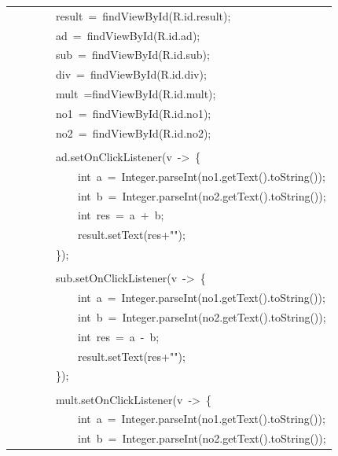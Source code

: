 \documentclass[a4paper,12pt]{article}
\begin{document}
\begin{longtable}{|p{}|}
{\ttfamily\small \ \ \ \ \ \ \ \ result\ =\ findViewById(R.id.result);} \\
{\ttfamily\small \ \ \ \ \ \ \ \ ad\ =\ findViewById(R.id.ad);} \\
{\ttfamily\small \ \ \ \ \ \ \ \ sub\ =\ findViewById(R.id.sub);} \\
{\ttfamily\small \ \ \ \ \ \ \ \ div\ =\ findViewById(R.id.div);} \\
{\ttfamily\small \ \ \ \ \ \ \ \ mult\ =findViewById(R.id.mult);} \\
{\ttfamily\small \ \ \ \ \ \ \ \ no1\ =\ findViewById(R.id.no1);} \\
{\ttfamily\small \ \ \ \ \ \ \ \ no2\ =\ findViewById(R.id.no2);} \\
\strut \\
{\ttfamily\small \ \ \ \ \ \ \ \ ad.setOnClickListener(v\ -\textgreater{}\ \{} \\
{\ttfamily\small \ \ \ \ \ \ \ \ \ \ \ \ int\ a\ =\ Integer.parseInt(no1.getText().toString());} \\
{\ttfamily\small \ \ \ \ \ \ \ \ \ \ \ \ int\ b\ =\ Integer.parseInt(no2.getText().toString());} \\
{\ttfamily\small \ \ \ \ \ \ \ \ \ \ \ \ int\ res\ =\ a\ +\ b;} \\
{\ttfamily\small \ \ \ \ \ \ \ \ \ \ \ \ result.setText(res+"");} \\
{\ttfamily\small \ \ \ \ \ \ \ \ \});} \\
\strut \\
{\ttfamily\small \ \ \ \ \ \ \ \ sub.setOnClickListener(v\ -\textgreater{}\ \{} \\
{\ttfamily\small \ \ \ \ \ \ \ \ \ \ \ \ int\ a\ =\ Integer.parseInt(no1.getText().toString());} \\
{\ttfamily\small \ \ \ \ \ \ \ \ \ \ \ \ int\ b\ =\ Integer.parseInt(no2.getText().toString());} \\
{\ttfamily\small \ \ \ \ \ \ \ \ \ \ \ \ int\ res\ =\ a\ -\ b;} \\
{\ttfamily\small \ \ \ \ \ \ \ \ \ \ \ \ result.setText(res+"");} \\
{\ttfamily\small \ \ \ \ \ \ \ \ \});} \\
\strut \\
{\ttfamily\small \ \ \ \ \ \ \ \ mult.setOnClickListener(v\ -\textgreater{}\ \{} \\
{\ttfamily\small \ \ \ \ \ \ \ \ \ \ \ \ int\ a\ =\ Integer.parseInt(no1.getText().toString());} \\
{\ttfamily\small \ \ \ \ \ \ \ \ \ \ \ \ int\ b\ =\ Integer.parseInt(no2.getText().toString());} \\

\end{longtable}
\end{document}
